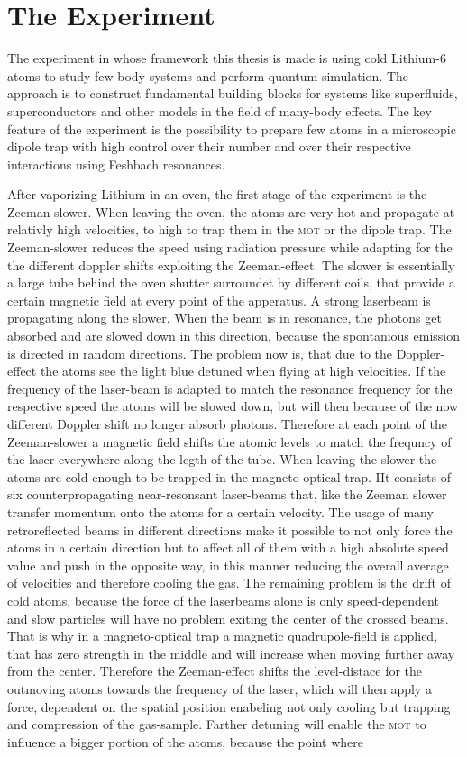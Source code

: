 \chapter{The Experiment}

The experiment in whose framework this thesis is made is using cold Lithium-6 atoms to study few body systems and perform quantum simulation. The approach is to construct fundamental building blocks for systems like superfluids, superconductors and other models in the field of many-body effects. The key feature of the experiment is the possibility to prepare few atoms in a microscopic dipole trap with high control over their number and over their respective interactions using Feshbach resonances.

After vaporizing Lithium in an oven, the first stage of the experiment is the Zeeman slower. When leaving the oven, the atoms are very hot and propagate at relativly high velocities, to high to trap them in the \textsc{mot} or the dipole trap. The Zeeman-slower reduces the speed using radiation pressure while adapting for the the different doppler shifts exploiting the Zeeman-effect. The slower is essentially a large tube behind the oven shutter surroundet by different coils, that provide a certain magnetic field at every point of the apperatus. A strong laserbeam is propagating along the slower. When the beam is in resonance, the photons get absorbed and are slowed down in this direction, because the spontanious emission is directed in random directions. The problem now is, that due to the Doppler-effect the atoms see the light blue detuned when flying at high velocities. If the frequency of the laser-beam is adapted to match the resonance frequency for the respective speed the atoms will be slowed down, but will then because of the now different Doppler shift no longer absorb photons. Therefore at each point of the Zeeman-slower a magnetic field shifts the atomic levels to match the frequncy of the laser everywhere along the legth of the tube. When leaving the slower the atoms are cold enough to be trapped in the magneto-optical trap. IIt consists of six counterpropagating near-resonsant laser-beams that, like the Zeeman slower transfer momentum onto the atoms for a certain velocity. The usage of many retroreflected beams in different directions make it possible to not only force the atoms in a certain direction but to affect all of them with a high absolute speed value and push in the opposite way, in this manner reducing the overall average of velocities and therefore cooling the gas. The remaining problem is the drift of cold atoms, because the force of the laserbeams alone is only speed-dependent and slow particles will have no problem exiting the center of the crossed beams. That is why in a magneto-optical trap a magnetic quadrupole-field is applied, that has zero strength in the middle and will increase when moving further away from the center. Therefore the Zeeman-effect shifts the level-distace for the outmoving atoms towards the frequency of the laser, which will then apply a force, dependent on the spatial position enabeling not only cooling but trapping and compression of the gas-sample. Farther detuning will enable the \textsc{mot} to influence a bigger portion of the atoms, because the point where 